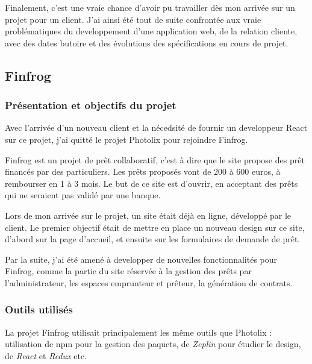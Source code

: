 \bigskip

Finalement, c'est une vraie chance d'avoir pu travailler dès mon arrivée
sur un projet pour un client. J'ai ainsi été tout de suite confrontée
aux vraie problématiques du developpement d'une application web, de la
relation cliente, avec des dates butoire et des évolutions des
spécifications en cours de projet.

\subsection{Finfrog}\label{finfrog}

\subsubsection{Présentation et objectifs du
projet}\label{pruxe9sentation-et-objectifs-du-projet-1}

\bigskip

Avec l'arrivée d'un nouveau client et la nécedsité de fournir un
developpeur React sur ce projet, j'ai quitté le projet Photolix pour
rejoindre Finfrog.

\bigskip

Finfrog est un projet de prêt collaboratif, c'est à dire que le site
propose des prêt financés par des particuliers. Les prêts proposés vont
de 200 à 600 euros, à rembourser en 1 à 3 mois. Le but de ce site est
d'ouvrir, en acceptant des prêts qui ne seraient pas validé par une
banque.

\bigskip

Lors de mon arrivée sur le projet, un site était déjà en ligne,
développé par le client. Le premier objectif était de mettre en place un
nouveau design sur ce site, d'abord sur la page d'accueil, et ensuite
sur les formulaires de demande de prêt.

\bigskip

Par la suite, j'ai été amené à developper de nouvelles fonctionnalités
pour Finfrog, comme la partie du site réservée à la gestion des prêts
par l'administrateur, les espaces emprunteur et prêteur, la génération
de contrats.

\subsubsection{Outils utilisés}\label{outils-utilisuxe9s-1}

\bigskip

La projet Finfrog utilisait principalement les même outils que Photolix
: utilisation de npm pour la gestion des paquets, de \emph{Zeplin} pour
étudier le design, de \emph{React} et \emph{Redux} etc.

